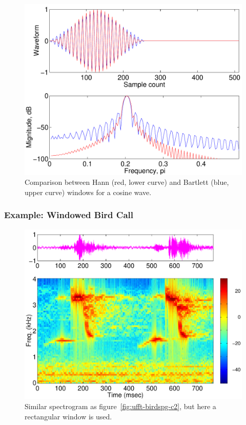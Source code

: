 \begin{figure}
\centerline{\includegraphics[height=0.35\textheight]{ch-fft/ufft_hannbartl_cosx512_256}}
\caption[Comparison between Hann and Bartlett windows for
a cosine wave]{Comparison between Hann (red, lower curve) and Bartlett
(blue, upper curve) windows for a cosine
wave.\label{fig:ufft-hnba-cosx}}
\end{figure}

\subsubsection{Example: Windowed Bird Call}

\begin{figure}
\centerline{\includegraphics[height=0.35\textheight]{ch-fft/ufft_cardinal1_spg128_127rect}}
\caption{Similar spectrogram as
figure~\protect\ref{fig:ufft-birdspg-c2}, but here a rectangular
window is used.\label{fig:ufft-birdspg-c3}}
\end{figure}

